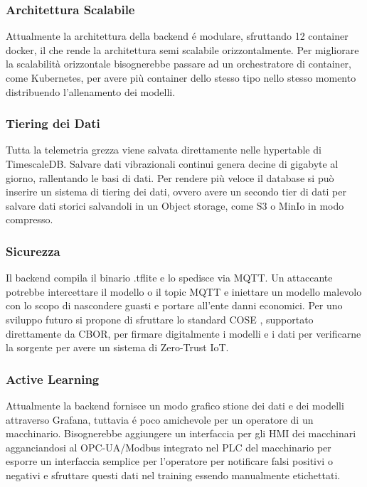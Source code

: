 \subsubsection{Architettura Scalabile}
Attualmente la architettura della backend é modulare, sfruttando 12 container docker, il che rende la architettura semi scalabile orizzontalmente. 
Per migliorare la scalabilità orizzontale bisognerebbe passare ad un orchestratore di container, come Kubernetes, per avere più container dello stesso tipo nello stesso momento distribuendo l'allenamento dei modelli.


\subsubsection{Tiering dei Dati}
Tutta la telemetria grezza viene salvata direttamente nelle hypertable di TimescaleDB.
Salvare dati vibrazionali continui genera decine di gigabyte al giorno, rallentando le basi di dati.
Per rendere più veloce il database si può inserire un sistema di tiering dei dati, ovvero avere un secondo tier di dati per salvare dati storici salvandoli in un Object storage, come S3 o MinIo in modo compresso.

\subsubsection{Sicurezza}
Il backend compila il binario .tflite e lo spedisce via MQTT.  Un attaccante potrebbe intercettare il modello o il topic MQTT e iniettare un modello malevolo con lo scopo di nascondere guasti e portare all'ente danni economici. %
Per uno sviluppo futuro si propone di sfruttare lo standard COSE \cite{schaad2022cose}, supportato direttamente da CBOR, per firmare digitalmente i modelli e i dati per verificarne la sorgente per avere un sistema di Zero-Trust IoT.


\subsubsection{Active Learning}
Attualmente la backend fornisce un modo grafico stione dei dati e dei modelli attraverso Grafana, tuttavia é poco amichevole per un operatore di un macchinario. Bisognerebbe aggiungere un interfaccia per gli HMI dei macchinari agganciandosi al OPC-UA/Modbus integrato nel PLC del macchinario per esporre un interfaccia semplice per l'operatore per notificare falsi positivi o negativi e sfruttare questi dati nel training essendo manualmente etichettati.

 